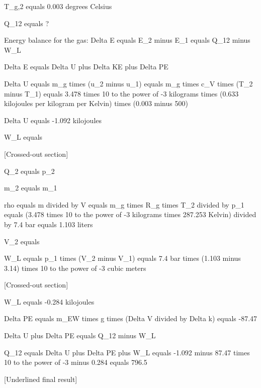T_g,2 equals 0.003 degrees Celsius  

Q_12 equals ?  

Energy balance for the gas:  
Delta E equals E_2 minus E_1 equals Q_12 minus W_L  

Delta E equals Delta U plus Delta KE plus Delta PE  

Delta U equals m_g times (u_2 minus u_1) equals m_g times c_V times (T_2 minus T_1) equals 3.478 times 10 to the power of -3 kilograms times (0.633 kilojoules per kilogram per Kelvin) times (0.003 minus 500)  

Delta U equals -1.092 kilojoules  

W_L equals  

[Crossed-out section]  

Q_2 equals p_2  

m_2 equals m_1  

rho equals m divided by V equals m_g times R_g times T_2 divided by p_1 equals (3.478 times 10 to the power of -3 kilograms times 287.253 Kelvin) divided by 7.4 bar equals 1.103 liters  

V_2 equals  

W_L equals p_1 times (V_2 minus V_1) equals 7.4 bar times (1.103 minus 3.14) times 10 to the power of -3 cubic meters  

[Crossed-out section]  

W_L equals -0.284 kilojoules  

Delta PE equals m_EW times g times (Delta V divided by Delta k) equals -87.47  

Delta U plus Delta PE equals Q_12 minus W_L  

Q_12 equals Delta U plus Delta PE plus W_L equals -1.092 minus 87.47 times 10 to the power of -3 minus 0.284 equals 796.5  

[Underlined final result]